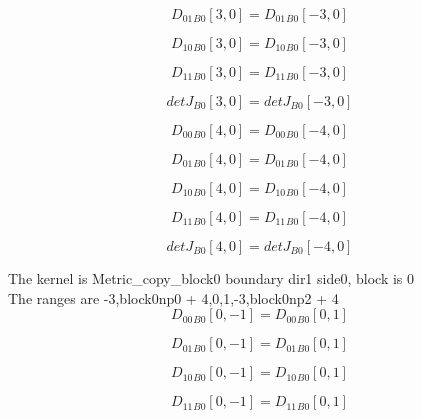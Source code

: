 \documentclass{article}
\begin{document}
\begin{dmath}{D_{01}{_{B0}}}[{3,0}] = {D_{01}{_{B0}}}[{-3,0}]\end{dmath}

\begin{dmath}{D_{10}{_{B0}}}[{3,0}] = {D_{10}{_{B0}}}[{-3,0}]\end{dmath}

\begin{dmath}{D_{11}{_{B0}}}[{3,0}] = {D_{11}{_{B0}}}[{-3,0}]\end{dmath}

\begin{dmath}{detJ{_{B0}}}[{3,0}] = {detJ{_{B0}}}[{-3,0}]\end{dmath}

\begin{dmath}{D_{00}{_{B0}}}[{4,0}] = {D_{00}{_{B0}}}[{-4,0}]\end{dmath}

\begin{dmath}{D_{01}{_{B0}}}[{4,0}] = {D_{01}{_{B0}}}[{-4,0}]\end{dmath}

\begin{dmath}{D_{10}{_{B0}}}[{4,0}] = {D_{10}{_{B0}}}[{-4,0}]\end{dmath}

\begin{dmath}{D_{11}{_{B0}}}[{4,0}] = {D_{11}{_{B0}}}[{-4,0}]\end{dmath}

\begin{dmath}{detJ{_{B0}}}[{4,0}] = {detJ{_{B0}}}[{-4,0}]\end{dmath}

\noindent The kernel is Metric_copy_block0 boundary dir1 side0, block is 0\\\noindent The ranges are -3,block0np0 + 4,0,1,-3,block0np2 + 4\\\begin{dmath}{D_{00}{_{B0}}}[{0,-1}] = {D_{00}{_{B0}}}[{0,1}]\end{dmath}

\begin{dmath}{D_{01}{_{B0}}}[{0,-1}] = {D_{01}{_{B0}}}[{0,1}]\end{dmath}

\begin{dmath}{D_{10}{_{B0}}}[{0,-1}] = {D_{10}{_{B0}}}[{0,1}]\end{dmath}

\begin{dmath}{D_{11}{_{B0}}}[{0,-1}] = {D_{11}{_{B0}}}[{0,1}]\end{dmath}
\end{document}
